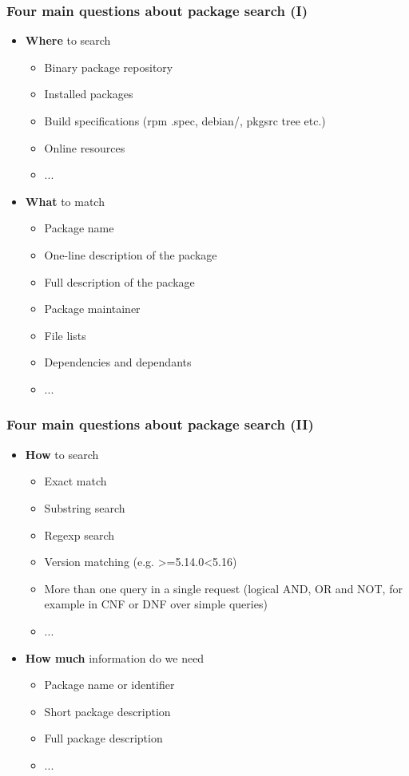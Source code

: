 \documentclass[hyperref=unicode,ascii,xcolor=dvipsnames]{beamer}
\begin{document}
\begin{frame}[fragile]
  \frametitle{Four main questions about package search (I)}
  \begin{itemize}
  \item {\bf Where} to search
    \begin{itemize}
    \item Binary package repository
    \item Installed packages
    \item Build specifications (rpm .spec, debian/, pkgsrc tree etc.)
    \item Online resources
    \item ...
    \end{itemize}
  \item {\bf What} to match
    \begin{itemize}
    \item Package name
    \item One-line description of the package
    \item Full description of the package
    \item Package maintainer
    \item File lists
    \item Dependencies and dependants
    \item ...
    \end{itemize}
  \end{itemize}
\end{frame}


\begin{frame}[fragile]
  \frametitle{Four main questions about package search (II)}
  \begin{itemize}
  \item {\bf How} to search
    \begin{itemize}
    \item Exact match
    \item Substring search
    \item Regexp search
    \item Version matching (e.g. >=5.14.0<5.16)
    \item More than one query in a single request (logical AND, OR
      and NOT, for example in CNF or DNF over simple queries)
    \item ...
    \end{itemize}
  \item {\bf How much} information do we need
    \begin{itemize}
    \item Package name or identifier
    \item Short package description
    \item Full package description
    \item ...
    \end{itemize}
  \end{itemize}
\end{frame}
\end{document}
